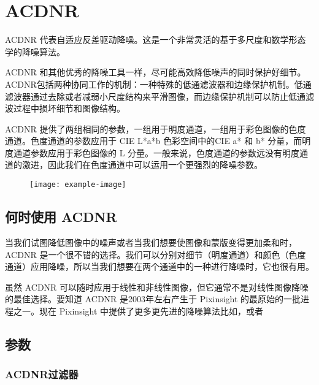 \chapter{ACDNR}

ACDNR 代表自适应反差驱动降噪。这是一个非常灵活的基于多尺度和数学形态学的降噪算法。

ACDNR 和其他优秀的降噪工具一样，尽可能高效降低噪声的同时保护好细节。ACDNR包括两种协同工作的机制：一种特殊的低通滤波器和边缘保护机制。低通滤波器通过去除或者减弱小尺度结构来平滑图像，而边缘保护机制可以防止低通滤波过程中损坏细节和图像结构。

ACDNR 提供了两组相同的参数，一组用于明度通道，一组用于彩色图像的色度通道。色度通道的参数应用于 CIE L*a*b 色彩空间中的CIE a* 和 b* 分量，而明度通道参数应用于彩色图像的 L 分量。一般来说，色度通道的参数远没有明度通道的激进，因此我们在色度通道中可以运用一个更强烈的降噪参数。

\begin{figure}[h]
  \centering
  \texttt{[image: example-image]}
\end{figure}


\section{何时使用 ACDNR}

当我们试图降低图像中的噪声或者当我们想要使图像和蒙版变得更加柔和时，ACDNR 是一个很不错的选择。我们可以分别对细节（明度通道）和颜色（色度通道）应用降噪，所以当我们想要在两个通道中的一种进行降噪时，它也很有用。

虽然 ACDNR 可以随时应用于线性和非线性图像，但它通常不是对线性图像降噪的最佳选择。要知道 ACDNR 是2003年左右产生于 Pixinsight 的最原始的一批进程之一。现在 Pixinsight 中提供了更多更先进的降噪算法比如，或者 


\section{参数}


\subsection{ACDNR过滤器}

